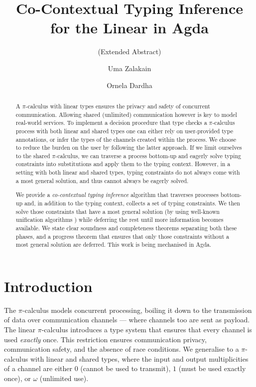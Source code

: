 \documentclass[sigplan,screen,review]{acmart}
\title
[Co-Contextual Typing Inference for the Linear \Picalc{} in Agda]
{Co-Contextual Typing Inference \\ for the Linear \Picalc{} in Agda}
\subtitle{(Extended Abstract)}
\author{Uma Zalakain}
\affiliation{University of Glasgow}
\author{Ornela Dardha}
\affiliation{University of Glasgow}
\theoremstyle{definition}\newtheorem{mytheorem}{Theorem}[section]
\newcommand{\picalc}{$\pi$-calculus}
\begin{document}
\begin{abstract}
  A \picalc{} with linear types ensures the privacy and safety of concurrent communication.
  Allowing shared (unlimited) communication however is key to model real-world services.
  To implement a decision procedure that type checks a \picalc{} process with both linear and shared types one can either rely on user-provided type annotations, or infer the types of the channels created within the process.
  We choose to reduce the burden on the user by following the latter approach.
  If we limit ourselves to the shared \picalc{}, we can traverse a process bottom-up and eagerly solve typing constraints into substitutions and apply them to the typing context.
  However, in a setting with both linear and shared types, typing constraints do not always come with a most general solution, and thus cannot always be eagerly solved.

  We provide a \emph{co-contextual typing inference} \cite{ErdwegBKKM15} algorithm that traverses processes bottom-up and, in addition to the typing context, collects a set of typing constraints.
  We then solve those constraints that have a most general solution (by using well-known unification algorithms \cite{McBride03}) while deferring the rest until more information becomes available.
  We state clear soundness and completeness theorems separating both these phases, and a progress theorem that ensures that only those constraints without a most general solution are deferred.
  This work is being mechanised in Agda.
\end{abstract}


\maketitle

\section{Introduction}\label{introduction}

The \picalc{} \cite{MilnerPW92a,Milner99} models concurrent processing, boiling it down to the transmission of data over communication channels --- where channels too are sent as payload.
The linear \picalc{} \cite{KobayashiPT96} introduces a type system that ensures that every channel is used \emph{exactly} once.
This restriction ensures communication privacy, communication safety, and the absence of race conditions.
We generalise to a \picalc{} with linear and shared types, where the input and output multiplicities of a channel are either $0$ (cannot be used to transmit), $1$ (must be used exactly once), or $\omega$ (unlimited use).
\end{document}

